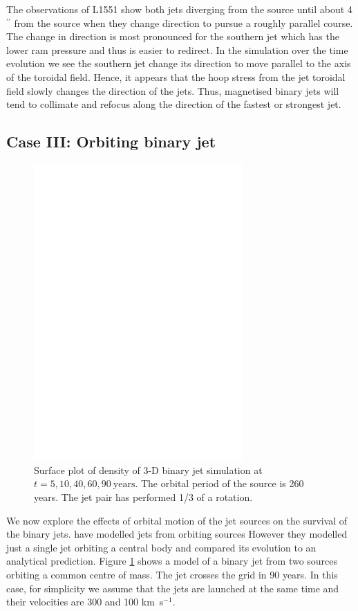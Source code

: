 \documentclass{aa}
\begin{document}
The observations of L1551 show both jets diverging from the source 
until about 4$^{\prime\prime}$ from the source when they change 
direction to pursue a roughly parallel course. The change in direction 
is most pronounced for the southern jet
which has the lower ram pressure and thus is easier to redirect.
In the simulation over the time evolution we see the southern jet change its
direction to move parallel to the axis of the toroidal field.
Hence, it appears that the hoop stress from the jet toroidal field slowly 
changes the direction of the jets.
Thus, magnetised binary jets will tend to collimate and refocus
along the direction of the fastest or strongest jet. 

\subsection{Case III: Orbiting binary jet}

\begin{figure}[ht]
\centering
\includegraphics[width=8cm]{8609fig6.eps}
\caption{ 
Surface plot of density of 3-D binary 
jet simulation at $t=5,10,40,60,90~\mathrm{years}$.
The orbital period of the source is 260 years.
The jet pair has performed 1/3 of a rotation.
}
\label{fig:4-6}
\end{figure}


We now explore the effects of orbital motion of the jet sources 
on the survival of the binary jets.
\citet{2002ApJ...568..733M} have modelled jets from orbiting sources
However they modelled just a single jet orbiting a central body and compared its
evolution to an analytical prediction.
Figure \ref{fig:4-6} shows a model of a binary jet from 
{ two sources orbiting} a common centre of mass. 
The jet crosses the grid in 90 years.
In this case, for 
simplicity we assume that the jets { are launched at the same time and their
velocities are 300 and 100 km~s$^{-1}$}.
\end{document}

